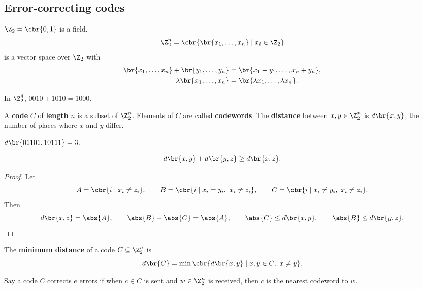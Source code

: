 \subsection{Error-correcting codes}

$ \Z_2 = \cbr{0, 1} $ is a field.
$$ \Z_2^n = \cbr{\br{x_1, \dots, x_n} \mid x_i \in \Z_2} $$
is a vector space over $ \Z_2 $ with
\begin{align*}
\br{x_1, \dots, x_n} + \br{y_1, \dots, y_n} & = \br{x_1 + y_1, \dots, x_n + y_n}, \\
\lambda\br{x_1, \dots, x_n} & = \br{\lambda x_1, \dots, \lambda x_n}.
\end{align*}

\begin{example*}
In $ \Z_2^4 $, $ 0010 + 1010 = 1000 $.
\end{example*}

\begin{definition*}
A \textbf{code} $ C $ of \textbf{length} $ n $ is a subset of $ \Z_2^n $. Elements of $ C $ are called \textbf{codewords}. The \textbf{distance} between $ x, y \in \Z_2^n $ is $ d\br{x, y} $, the number of places where $ x $ and $ y $ differ.
\end{definition*}

\begin{example*}
$ d\br{01101, 10111} = 3 $.
\end{example*}

\begin{proposition}
\label{prop:1.1}
$$ d\br{x, y} + d\br{y, z} \ge d\br{x, z}. $$
\end{proposition}

\begin{proof}
Let
$$ A = \cbr{i \mid x_i \ne z_i}, \qquad B = \cbr{i \mid x_i = y_i, \ x_i \ne z_i}, \qquad C = \cbr{i \mid x_i \ne y_i, \ x_i \ne z_i}. $$
Then
$$ d\br{x, z} = \abs{A}, \qquad \abs{B} + \abs{C} = \abs{A}, \qquad \abs{C} \le d\br{x, y}, \qquad \abs{B} \le d\br{y, z}. $$
\end{proof}


\begin{definition*}
The \textbf{minimum distance} of a code $ C \subseteq \Z_2^n $ is
$$ d\br{C} = \min\cbr{d\br{x, y} \mid x, y \in C, \ x \ne y}. $$
\end{definition*}

Say a code $ C $ corrects $ e $ errors if when $ c \in C $ is sent and $ w \in \Z_2^n $ is received, then $ c $ is the nearest codeword to $ w $.

